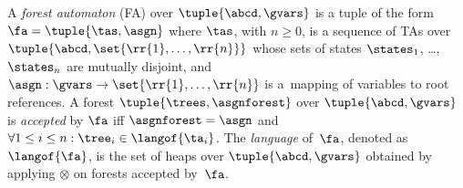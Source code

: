 A \emph{forest automaton} (FA) over $\tuple{\abcd, \gvars}$ is a tuple of the
form $\fa = \tuple{\tas, \asgn}$ where $\tas$, with $n \geq 0$, is a sequence of TAs
over $\tuple{\abcd, \set{\rr{1}, \ldots , \rr{n}}}$ whose sets
of states $\states_1$, \dots, $\states_n$ are mutually disjoint, and $\asgn:
\gvars \to \set{\rr{1}, \ldots , \rr{n}}$ is a~mapping of variables to
root references.
%
A forest $\tuple{\trees, \asgnforest}$ over $\tuple{\abcd,\gvars}$ is
\emph{accepted} by $\fa$ iff $\asgnforest = \asgn$ and
$\forall 1 \leq i \leq n: \tree_i \in \langof{\ta_i}$.
%
%
%
%
The \emph{language} of~$\fa$, denoted as $\langof{\fa}$, is the set of heaps
over $\tuple{\abcd, \gvars}$ obtained by applying $\otimes$ on
forests accepted by~$\fa$.


